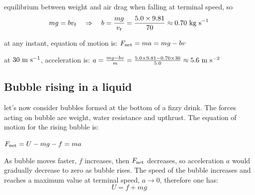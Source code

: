 
\begin{soln}equilibrium between weight and air drag when falling at terminal speed, so
\begin{equation*}
	mg = bv_t \quad \Rightarrow \quad b = \frac{mg}{v_t} = \frac{5.0\times9.81}{70} \approx 0.70 \text{ kg s}^{-1}
\end{equation*}

at any instant, equation of motion is: $F_\text{net} = ma = mg - bv$

at $30\text{ m s$^{-1}$}$, acceleration is: $a = \frac{mg-bv}{m} = \frac{5.0\times9.81-0.70\times30}{5.0} \approx 5.6 \text{ m s$^{-2}$}$ \end{soln}

\subsection*{Bubble rising in a liquid}

\begin{marginfigure}
	\vspace*{-16pt}
	\centering
	\vspace*{-16pt}
\end{marginfigure}

let's now consider bubbles formed at the bottom of a fizzy drink. The forces acting on bubble are weight, water resistance and upthrust. The equation of motion for the rising bubble is:

{
	\centering
	
	$ F_\text{net} = U - mg - f = ma $
	
}

As bubble moves faster, $f$ increases, then $F_\text{net}$ decreases, so acceleration $a$ would gradually decrease to zero as bubble rises. The speed of the bubble increases and reaches a maximum value at terminal speed, $a\to0$, therefore one has: $$U=f+mg$$




